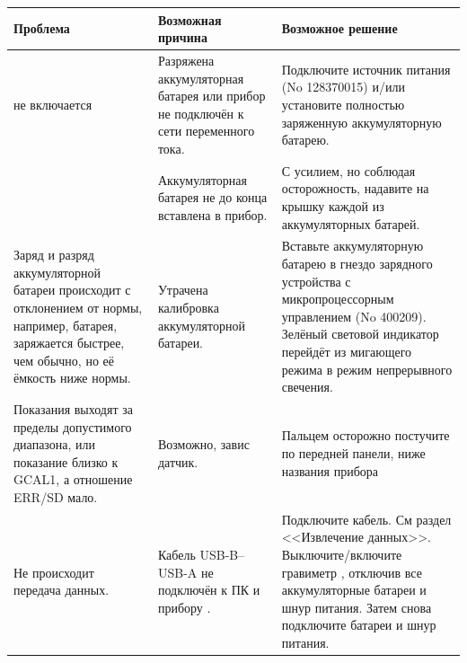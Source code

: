\begin{longtable}{|p{}|p{}|p{}|}
  \hline
  Проблема & Возможная причина & Возможное решение \\
  \hline
  \cg{} не включается &
  Разряжена аккумуляторная батарея или прибор не подключён к сети переменного
  тока. & 
  Подключите источник питания (No 128370015) и/или установите полностью
  заряженную аккумуляторную батарею. \\
  \cline{2-3}
  & Аккумуляторная батарея не до конца вставлена в прибор. &
  С усилием, но соблюдая осторожность, надавите на крышку каждой из
  аккумуляторных батарей. \\
  \hline
  Заряд и разряд аккумуляторной батареи происходит с отклонением от нормы,
  например, батарея, заряжается быстрее, чем обычно, но её ёмкость ниже нормы. &
  Утрачена калибровка аккумуляторной батареи. &
  Вставьте аккумуляторную батарею в гнездо зарядного устройства с
  микропроцессорным управлением (No 400209).  Зелёный световой индикатор перейдёт
  из мигающего режима в режим непрерывного свечения. \\
  \hline
  Показания выходят за пределы допустимого диапазона, или показание близко к
  GCAL1, а отношение ERR/SD мало. &
  Возможно, завис датчик. &
  Пальцем осторожно постучите по передней панели, ниже названия прибора \cg{} \\
  \hline
  Не происходит передача данных. & Кабель USB-B--USB-A не подключён к ПК и
  прибору \cg{}. &
  Подключите кабель. См раздел <<Извлечение данных>>. Выключите/включите
  гравиметр \cg{}, отключив все аккумуляторные батареи и шнур питания. Затем
  снова подключите батареи и шнур питания. \\
  \hline
\end{longtable}
